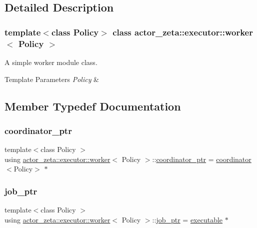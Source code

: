 \subsection{Detailed Description}
\subsubsection*{template$<$class Policy$>$\newline
class actor\+\_\+zeta\+::executor\+::worker$<$ Policy $>$}

A simple worker module class. 


\begin{DoxyTemplParams}{Template Parameters}
{\em Policy} & \\
\hline
\end{DoxyTemplParams}


\subsection{Member Typedef Documentation}
\mbox{\label{classactor__zeta_1_1executor_1_1worker_a0f64bbb63577325b5217ccee17a28738}} 
\subsubsection{\texorpdfstring{coordinator\+\_\+ptr}{coordinator\_ptr}}
{\footnotesize\ttfamily template$<$class Policy $>$ \\
using \hyperlink{classactor__zeta_1_1executor_1_1worker}{actor\+\_\+zeta\+::executor\+::worker}$<$ Policy $>$\+::\hyperlink{classactor__zeta_1_1executor_1_1worker_a0f64bbb63577325b5217ccee17a28738}{coordinator\+\_\+ptr} =  \hyperlink{classactor__zeta_1_1executor_1_1coordinator}{coordinator}$<$Policy$>$ $\ast$}

\mbox{\label{classactor__zeta_1_1executor_1_1worker_a74e3d9df71ad0b0df8d0c5403f8e642a}} 
\subsubsection{\texorpdfstring{job\+\_\+ptr}{job\_ptr}}
{\footnotesize\ttfamily template$<$class Policy $>$ \\
using \hyperlink{classactor__zeta_1_1executor_1_1worker}{actor\+\_\+zeta\+::executor\+::worker}$<$ Policy $>$\+::\hyperlink{classactor__zeta_1_1executor_1_1worker_a74e3d9df71ad0b0df8d0c5403f8e642a}{job\+\_\+ptr} =  \hyperlink{structactor__zeta_1_1executor_1_1executable}{executable} $\ast$}

